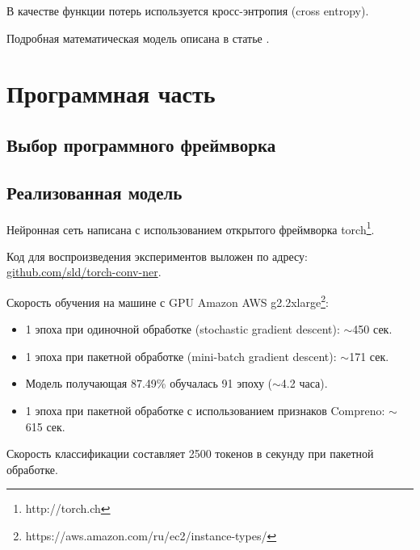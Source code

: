   В качестве функции потерь используется кросс-энтропия (cross entropy).

  Подробная математическая модель описана в статье \citep{collobert2011natural}.

\section{Программная часть}

\subsection{Выбор программного фреймворка}


\subsection{Реализованная модель}

Нейронная сеть написана с использованием открытого фреймворка torch\footnote{http://torch.ch}.

Код для воспроизведения экспериментов выложен по адресу:
\href{https://github.com/sld/torch-conv-ner}{github.com/sld/torch-conv-ner}.

Скорость обучения на машине с GPU Amazon AWS g2.2xlarge\footnote{https://aws.amazon.com/ru/ec2/instance-types/}:
\begin{itemize}
\item 1 эпоха при одиночной обработке (stochastic gradient descent): $\sim$450 сек.
\item 1 эпоха при пакетной обработке (mini-batch gradient descent): $\sim$171 сек.
\item Модель получающая 87.49\% обучалась 91 эпоху ($\sim$4.2 часа).
\item 1 эпоха при пакетной обработке с использованием признаков Compreno: $\sim$615 сек.
\end{itemize}

Скорость классификации составляет 2500 токенов в секунду при пакетной обработке.

